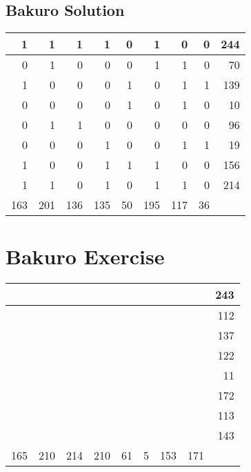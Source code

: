 \documentclass[]{article}
\begin{document}
 \subsection{Bakuro Solution} 
\begin{tabular}{rrrrrrrrr}
\hline
   1 &   1 &   1 &   1 &  0 &   1 &   0 &  0 & 244 \\ \hline
   0 &   1 &   0 &   0 &  0 &   1 &   1 &  0 &  70 \\ \hline
   1 &   0 &   0 &   0 &  1 &   0 &   1 &  1 & 139 \\ \hline
   0 &   0 &   0 &   0 &  1 &   0 &   1 &  0 &  10 \\ \hline
   0 &   1 &   1 &   0 &  0 &   0 &   0 &  0 &  96 \\ \hline
   0 &   0 &   0 &   1 &  0 &   0 &   1 &  1 &  19 \\ \hline
   1 &   0 &   0 &   1 &  1 &   1 &   0 &  0 & 156 \\ \hline
   1 &   1 &   0 &   1 &  0 &   1 &   1 &  0 & 214 \\ \hline
 163 & 201 & 136 & 135 & 50 & 195 & 117 & 36 &     \\ \hline
\hline
\end{tabular}\newpage\section{Bakuro Exercise}\begin{tabular}{rrrrrrrrr}
\hline
     &     &     &     &    &   &     &     & 243 \\ \hline
     &     &     &     &    &   &     &     & 112 \\ \hline
     &     &     &     &    &   &     &     & 137 \\ \hline
     &     &     &     &    &   &     &     & 122 \\ \hline
     &     &     &     &    &   &     &     &  11 \\ \hline
     &     &     &     &    &   &     &     & 172 \\ \hline
     &     &     &     &    &   &     &     & 113 \\ \hline
     &     &     &     &    &   &     &     & 143 \\ \hline
 165 & 210 & 214 & 210 & 61 & 5 & 153 & 171 &     \\ \hline
\hline
\end{tabular}\newpage 
\end{document}
